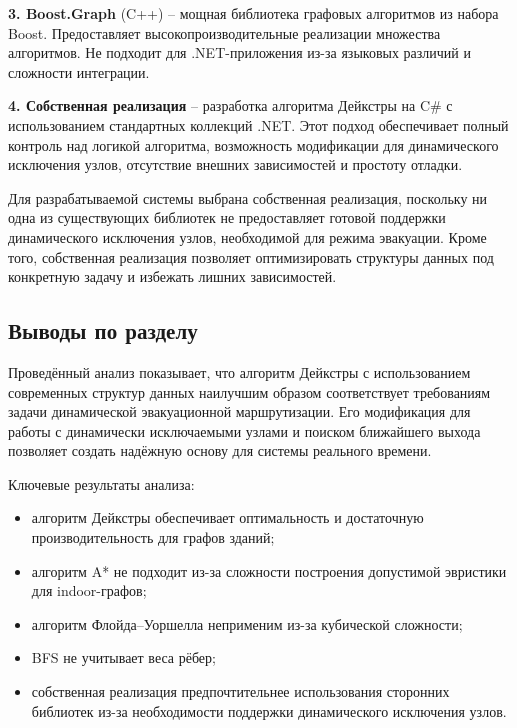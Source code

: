 \textbf{3. Boost.Graph} (C++) -- мощная библиотека графовых алгоритмов из набора Boost. Предоставляет высокопроизводительные реализации множества алгоритмов. Не подходит для .NET-приложения из-за языковых различий и сложности интеграции.

\textbf{4. Собственная реализация} -- разработка алгоритма Дейкстры на C\# с использованием стандартных коллекций .NET. Этот подход обеспечивает полный контроль над логикой алгоритма, возможность модификации для динамического исключения узлов, отсутствие внешних зависимостей и простоту отладки.

Для разрабатываемой системы выбрана собственная реализация, поскольку ни одна из существующих библиотек не предоставляет готовой поддержки динамического исключения узлов, необходимой для режима эвакуации. Кроме того, собственная реализация позволяет оптимизировать структуры данных под конкретную задачу и избежать лишних зависимостей.

\subsection{Выводы по разделу}

Проведённый анализ показывает, что алгоритм Дейкстры с использованием современных структур данных наилучшим образом соответствует требованиям задачи динамической эвакуационной маршрутизации. Его модификация для работы с динамически исключаемыми узлами и поиском ближайшего выхода позволяет создать надёжную основу для системы реального времени.

Ключевые результаты анализа:
\begin{itemize}
\item алгоритм Дейкстры обеспечивает оптимальность и достаточную производительность для графов зданий;
\item алгоритм A* не подходит из-за сложности построения допустимой эвристики для indoor-графов;
\item алгоритм Флойда--Уоршелла неприменим из-за кубической сложности;
\item BFS не учитывает веса рёбер;
\item собственная реализация предпочтительнее использования сторонних библиотек из-за необходимости поддержки динамического исключения узлов.
\end{itemize}

